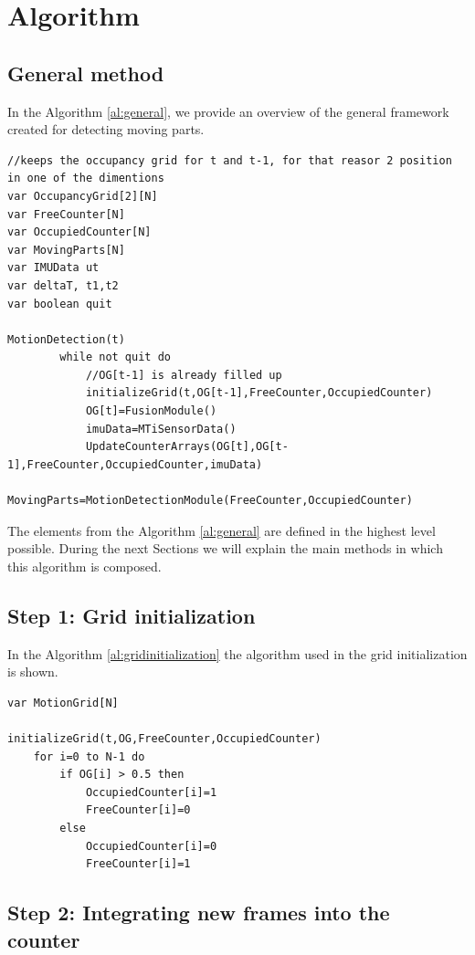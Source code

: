 \section{Algorithm}

\subsection{General method}

In the Algorithm \ref{al:general}, we provide an overview of the general framework created for detecting moving parts.

\begin{lstlisting}[title={Algorithm},label=al:general,caption={General framework algorithm for motion detection}]
//keeps the occupancy grid for t and t-1, for that reasor 2 position in one of the dimentions
var OccupancyGrid[2][N]
var FreeCounter[N] 
var OccupiedCounter[N] 
var MovingParts[N]
var IMUData ut
var deltaT, t1,t2
var boolean quit

MotionDetection(t)
		while not quit do
			//OG[t-1] is already filled up 		
			initializeGrid(t,OG[t-1],FreeCounter,OccupiedCounter)
			OG[t]=FusionModule()
			imuData=MTiSensorData()
			UpdateCounterArrays(OG[t],OG[t-1],FreeCounter,OccupiedCounter,imuData)
			MovingParts=MotionDetectionModule(FreeCounter,OccupiedCounter)
\end{lstlisting}

The elements from the Algorithm \ref{al:general} are defined in the highest level possible. During the next Sections we will explain the main methods in which this algorithm is composed.

\subsection{Step 1: Grid initialization}

In the Algorithm \ref{al:gridinitialization} the algorithm used in the grid initialization is shown.

\begin{lstlisting}[title={Algorithm},label=al:gridinitialization,caption={Grid initialization}]
var MotionGrid[N]

initializeGrid(t,OG,FreeCounter,OccupiedCounter)
	for i=0 to N-1 do
		if OG[i] > 0.5 then 
			OccupiedCounter[i]=1
			FreeCounter[i]=0
		else
			OccupiedCounter[i]=0
			FreeCounter[i]=1

\end{lstlisting}

\subsection{Step 2: Integrating new frames into the counter}

